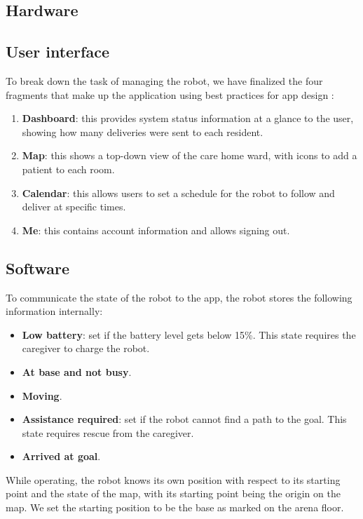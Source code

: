 \documentclass{article}
\begin{document}
\subsection{Hardware}

\subsection{User interface}
To break down the task of managing the robot, we have finalized the four fragments that make up the application using best practices for app design \cite{design, ux}:
\begin{enumerate}
  \item {\bf Dashboard}: this provides system status information at a glance to the user, showing how many deliveries were sent to each resident.
  \item {\bf Map}: this shows a top-down view of the care home ward, with icons to add a patient to each room.
  \item {\bf Calendar}: this allows users to set a schedule for the robot to follow and deliver at specific times.
  \item {\bf Me}: this contains account information and allows signing out. 
  \end{enumerate}
  
\subsection{Software}
To communicate the state of the robot to the app, the robot stores the following information internally:
\begin{itemize}
\item {\bf Low battery}: set if the battery level gets below 15\%. This state requires the caregiver to charge the robot. 
\item {\bf At base and not busy}. 
\item {\bf Moving}.
\item {\bf Assistance required}: set if the robot cannot find a path to the goal. This state requires rescue from the caregiver. 
\item {\bf Arrived at goal}.
\end{itemize}

While operating, the robot knows its own position with respect to its starting point and the state of the map, with its starting point being the origin on the map. We set the starting position to be the base as marked on the arena floor. 
\end{document}

